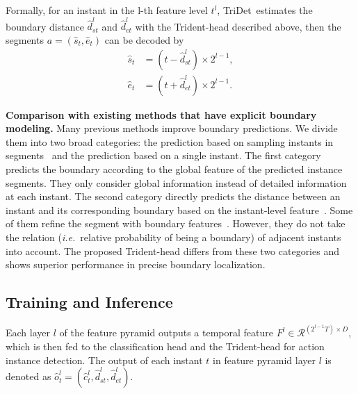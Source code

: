 \documentclass[10pt,twocolumn,letterpaper]{article}
\def\ie{{\em i.e.}}
\newcommand{\myPara}[1]{\vspace{.05in}\noindent\textbf{#1}}
\newcommand{\mc}[1]{\mathcal{#1}}
\def\name{TriDet}
\begin{document}
Formally, for an instant in the l-th feature level $t^l$,  \name~estimates the boundary distance $\hat{d}_{st}^l$ and $\hat{d}_{et}^l$ with the Trident-head described above, then the segments $a=(\hat{s}_t, \hat{e}_t)$ can be decoded by 
\begin{align}
    \hat{s}_t &= (t-\hat{d}_{st}^l)\times 2^{l-1},\\
    \hat{e}_t &= (t+\hat{d}_{et}^l)\times 2^{l-1}.
\end{align}


\myPara{Comparison with existing methods that have explicit boundary modeling.} Many previous methods improve boundary predictions. We divide them into two broad categories: the prediction based on sampling instants in segments~\cite{lin2019bmn,liu2022end,shi2022react} and the prediction based on a single instant. The first category predicts the boundary 
according to the global feature of the predicted instance segments.
They only consider global information instead of detailed information at each instant. The second category directly predicts the distance between an instant and its corresponding boundary based on the instant-level feature~\cite{lin2021learning,zhang2022actionformer,zhao2021video,qing2021temporal}. Some of them refine the segment with boundary features~\cite{lin2021learning,qing2021temporal,zhao2021video}. 
However, they do not take the relation (\ie~relative probability of being a boundary) of adjacent instants into account.
The proposed Trident-head differs from these two categories and shows superior performance in precise boundary localization.



\subsection{Training and Inference}
Each layer $l$ of the feature pyramid outputs a temporal feature $F^l \in \mc{R}^{(2^{l-1}T)\times D}$, which is then fed to the classification head and the Trident-head for action instance detection. The output of each instant $t$ in feature pyramid layer $l$ is denoted as $\hat{o}_{t}^l = (\hat{c}_{t}^l, \hat{d}_{st}^l, \hat{d}_{et}^l)$. 
\end{document}
